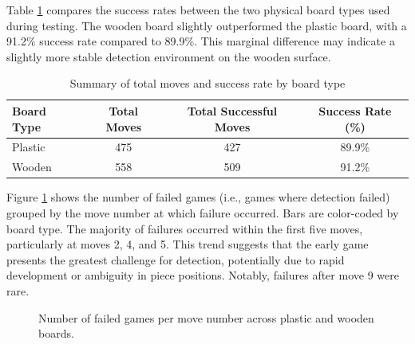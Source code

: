 Table \ref{tab:board-type-accuracy} compares the success rates between the two physical board types used during testing. The wooden board slightly outperformed the plastic board, with a 91.2\% success rate compared to 89.9\%. This marginal difference may indicate a slightly more stable detection environment on the wooden surface. \\


\begin{table}[htbp]
\centering
\caption[Move detection accuracy board type]{Summary of total moves and success rate by board type}
\label{tab:board-type-accuracy}
\begin{tabular}{lccc}
\toprule
\textbf{Board Type} & \textbf{Total Moves} & \textbf{Total Successful Moves} & \textbf{Success Rate (\%)} \\
\midrule
Plastic & 475 & 427 & 89.9\% \\
Wooden  & 558 & 509 & 91.2\% \\
\bottomrule
\end{tabular}
\end{table}


Figure \ref{fig:move-failures} shows the number of failed games (i.e., games where detection failed) grouped by the move number at which failure occurred. Bars are color-coded by board type. The majority of failures occurred within the first five moves, particularly at moves 2, 4, and 5. This trend suggests that the early game presents the greatest challenge for detection, potentially due to rapid development or ambiguity in piece positions. Notably, failures after move 9 were rare. \\


\begin{figure}[h!]
\centering
{}
\caption[Detection failures per move number]{Number of failed games per move number across plastic and wooden boards.}
\label{fig:move-failures}
\end{figure}



